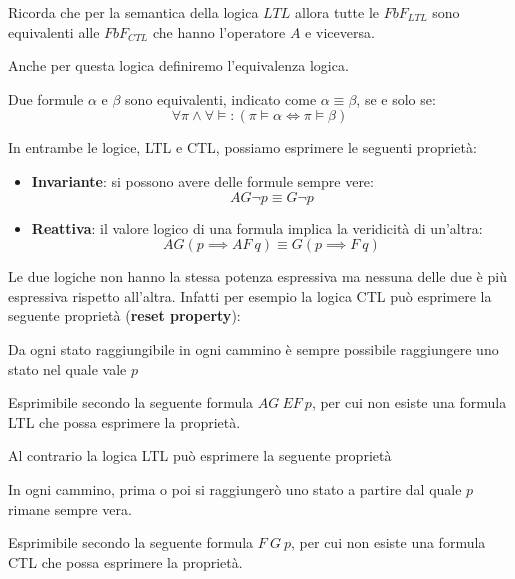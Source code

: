 \begin{nota}
    Ricorda che per la semantica della logica $LTL$ allora tutte le $FbF_{LTL}$
    sono equivalenti alle $FbF_{CTL}$ che hanno l'operatore $A$ e viceversa.
\end{nota}
Anche per questa logica definiremo l'equivalenza logica.
\begin{definizione}
    Due formule $\alpha$ e $\beta$ sono equivalenti, indicato come $\alpha \equiv
        \beta$, se e solo se:
    \begin{equation}
        \forall \pi \land \forall \models : (\pi \models \alpha \iff \pi \models
        \beta)
    \end{equation}
\end{definizione}
In entrambe le logice, LTL e CTL, possiamo esprimere le seguenti proprietà:
\begin{itemize}
    \item \textbf{Invariante}: si possono avere delle formule sempre vere:
          \begin{equation}
              AG\lnot p \equiv G\lnot p
          \end{equation}
    \item \textbf{Reattiva}: il valore logico di una formula implica la veridicità
          di un'altra:
          \begin{equation}
              AG (p\implies AF \ q) \equiv G(p\implies F \ q)
          \end{equation}
\end{itemize}
Le due logiche non hanno la stessa potenza espressiva ma nessuna delle due è più
espressiva rispetto all'altra. Infatti per esempio la logica CTL può esprimere
la seguente proprietà (\textbf{reset property}):
\begin{center}
    Da ogni stato raggiungibile in ogni cammino è sempre possibile raggiungere
    uno stato nel quale vale $p$
\end{center}
Esprimibile secondo la seguente formula $AG \ EF \ p$, per cui non esiste una formula
LTL che possa esprimere la proprietà.

Al contrario la logica LTL può esprimere la seguente proprietà
\begin{center}
    In ogni cammino, prima o poi si raggiungerò uno stato a partire dal quale $p$
    rimane sempre vera.
\end{center}
Esprimibile secondo la seguente formula $F \ G \ p$, per cui non esiste una formula
CTL che possa esprimere la proprietà.

